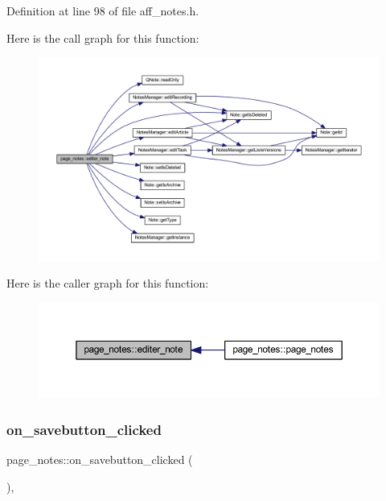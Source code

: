 Definition at line 98 of file aff\+\_\+notes.\+h.

Here is the call graph for this function\+:\nopagebreak
\begin{figure}[H]
\begin{center}
\leavevmode
\includegraphics[width=350pt]{classpage__notes_a9fd367fb577c6048353f18ad56792c1f_cgraph}
\end{center}
\end{figure}
Here is the caller graph for this function\+:\nopagebreak
\begin{figure}[H]
\begin{center}
\leavevmode
\includegraphics[width=350pt]{classpage__notes_a9fd367fb577c6048353f18ad56792c1f_icgraph}
\end{center}
\end{figure}
\mbox{\label{classpage__notes_a3810696feb56abdad663cb7ae4b2f1b0}} 
\subsubsection{\texorpdfstring{on\+\_\+savebutton\+\_\+clicked}{on\_savebutton\_clicked}}
{\footnotesize\ttfamily page\+\_\+notes\+::on\+\_\+savebutton\+\_\+clicked (\begin{DoxyParamCaption}{ }\end{DoxyParamCaption})\hspace{0.3cm}{\ttfamily [inline]}, {\ttfamily [slot]}}



